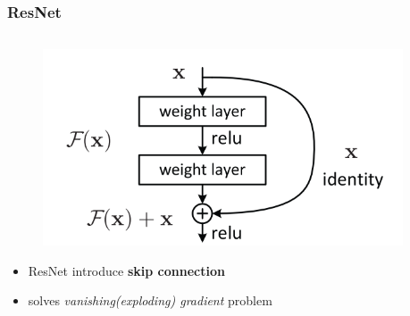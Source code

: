 \documentclass{beamer}
\begin{document}
\begin{frame}
\frametitle{ResNet}
\begin{columns}
	\begin{column}{0.5\textwidth}
		\begin{figure}
			\centering
			\includegraphics[width=\textwidth]{images/resnet_block.png}
		\end{figure}
	\begin{itemize}
		\item ResNet introduce \textbf{skip connection}
		\item solves \textit{vanishing(exploding) gradient} problem
	\end{itemize}
	\end{column}
	\begin{column}{0.5\textwidth}
		\centering

\end{column}
\end{columns}
\end{frame}
\end{document}
